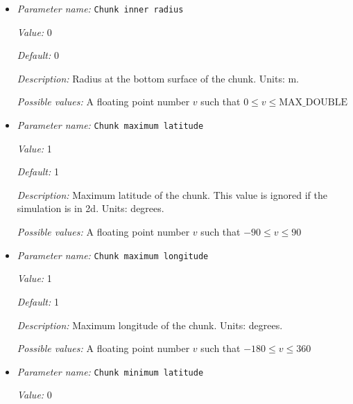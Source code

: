 \begin{itemize}
\item {\it Parameter name:} {\tt Chunk inner radius}
\label{parameters:Geometry model/Chunk/Chunk inner radius}
\label{parameters:Geometry_20model/Chunk/Chunk_20inner_20radius}


{\it Value:} 0


{\it Default:} 0


{\it Description:} Radius at the bottom surface of the chunk. Units: m.


{\it Possible values:} A floating point number $v$ such that $0 \leq v \leq \text{MAX\_DOUBLE}$
\item {\it Parameter name:} {\tt Chunk maximum latitude}
\label{parameters:Geometry model/Chunk/Chunk maximum latitude}
\label{parameters:Geometry_20model/Chunk/Chunk_20maximum_20latitude}


{\it Value:} 1


{\it Default:} 1


{\it Description:} Maximum latitude of the chunk. This value is ignored if the simulation is in 2d. Units: degrees.


{\it Possible values:} A floating point number $v$ such that $-90 \leq v \leq 90$
\item {\it Parameter name:} {\tt Chunk maximum longitude}
\label{parameters:Geometry model/Chunk/Chunk maximum longitude}
\label{parameters:Geometry_20model/Chunk/Chunk_20maximum_20longitude}


{\it Value:} 1


{\it Default:} 1


{\it Description:} Maximum longitude of the chunk. Units: degrees.


{\it Possible values:} A floating point number $v$ such that $-180 \leq v \leq 360$
\item {\it Parameter name:} {\tt Chunk minimum latitude}
\label{parameters:Geometry model/Chunk/Chunk minimum latitude}
\label{parameters:Geometry_20model/Chunk/Chunk_20minimum_20latitude}


{\it Value:} 0



\end{itemize}
